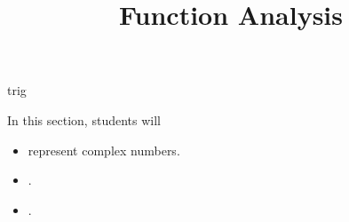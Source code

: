 \documentclass{ximera}
\title{Function Analysis}
\begin{document}
\begin{abstract}
%
\end{abstract}
\maketitle








trig



\begin{sectionOutcomes}
In this section, students will 

\begin{itemize}
\item represent complex numbers.
\item .
\item .
\end{itemize}
\end{sectionOutcomes}
\end{document}
